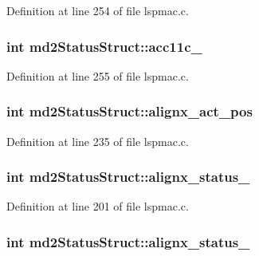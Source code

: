 Definition at line 254 of file lspmac.c.\hypertarget{structmd2StatusStruct_ac7029100738dcc3f09a8b0d1d3d1d353}{
\subsubsection[{acc11c\_\-6}]{\setlength{\rightskip}{0pt plus 5cm}int {\bf md2StatusStruct::acc11c\_}}}
\label{structmd2StatusStruct_ac7029100738dcc3f09a8b0d1d3d1d353}


Definition at line 255 of file lspmac.c.\hypertarget{structmd2StatusStruct_a9653a75bc0b66c5f86d8b0206dc39b4f}{
\subsubsection[{alignx\_\-act\_\-pos}]{\setlength{\rightskip}{0pt plus 5cm}int {\bf md2StatusStruct::alignx\_\-act\_\-pos}}}
\label{structmd2StatusStruct_a9653a75bc0b66c5f86d8b0206dc39b4f}


Definition at line 235 of file lspmac.c.\hypertarget{structmd2StatusStruct_a56accf8cb00c59bff87ed75df7dafbbe}{
\subsubsection[{alignx\_\-status\_\-1}]{\setlength{\rightskip}{0pt plus 5cm}int {\bf md2StatusStruct::alignx\_\-status\_}}}
\label{structmd2StatusStruct_a56accf8cb00c59bff87ed75df7dafbbe}


Definition at line 201 of file lspmac.c.\hypertarget{structmd2StatusStruct_a2feb35ceab8129fd2cc34d1104af8b8f}{
\subsubsection[{alignx\_\-status\_\-2}]{\setlength{\rightskip}{0pt plus 5cm}int {\bf md2StatusStruct::alignx\_\-status\_}}}
\label{structmd2StatusStruct_a2feb35ceab8129fd2cc34d1104af8b8f}


